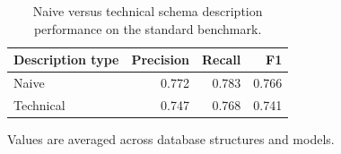 \begin{table}[htbp]
\centering
\small
\caption{Naive versus technical schema description performance on the standard benchmark.}
\label{tab:schema-description-comparison}
\begin{tabular}{lrrr}
\toprule
Description type & Precision & Recall & F1 \\
\midrule
Naive & 0.772 & 0.783 & 0.766 \\
Technical & 0.747 & 0.768 & 0.741 \\
\bottomrule
\end{tabular}
\par\footnotesize{Values are averaged across database structures and models.}
\end{table}
